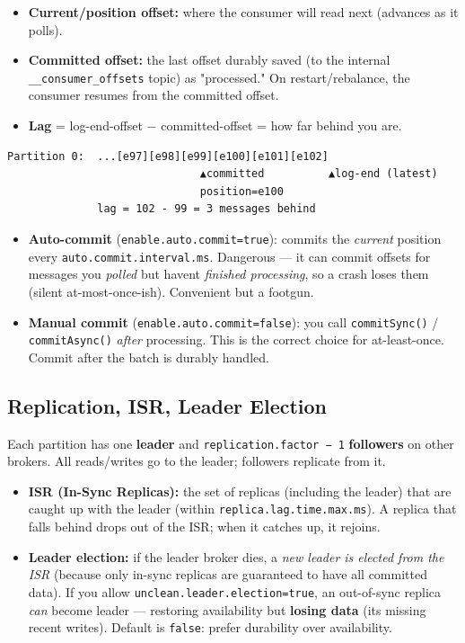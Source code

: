 \documentclass[11pt]{article}
\providecommand{\tightlist}{\setlength{\itemsep}{1pt}\setlength{\parskip}{0pt}}
\begin{document}
\begin{itemize}
\tightlist
\item
  \textbf{Current/position offset:} where the consumer will read next (advances as it polls).
\item
  \textbf{Committed offset:} the last offset durably saved (to the internal \texttt{\_\_consumer\_offsets} topic) as "processed." On restart/rebalance, the consumer resumes from the committed offset.
\item
  \textbf{Lag} = log-end-offset \(-\) committed-offset = how far behind you are.
\end{itemize}

\setcodelang{}

\begin{verbatim}
Partition 0:  ...[e97][e98][e99][e100][e101][e102]
                              ▲committed          ▲log-end (latest)
                              position=e100
              lag = 102 - 99 = 3 messages behind
\end{verbatim}

\begin{itemize}
\tightlist
\item
  \textbf{Auto-commit} (\texttt{enable.auto.commit=true}): commits the \emph{current} position every \texttt{auto.commit.interval.ms}. Dangerous --- it can commit offsets for messages you \emph{polled} but haven\textquotesingle t \emph{finished processing}, so a crash loses them (silent at-most-once-ish). Convenient but a footgun.
\item
  \textbf{Manual commit} (\texttt{enable.auto.commit=false}): you call \texttt{commitSync()} / \texttt{commitAsync()} \emph{after} processing. This is the correct choice for at-least-once. Commit after the batch is durably handled.
\end{itemize}

\subsection{Replication, ISR, Leader Election}\label{replication-isr-leader-election}

Each partition has one \textbf{leader} and \texttt{replication.factor\ −\ 1} \textbf{followers} on other brokers. All reads/writes go to the leader; followers replicate from it.

\begin{itemize}
\tightlist
\item
  \textbf{ISR (In-Sync Replicas):} the set of replicas (including the leader) that are caught up with the leader (within \texttt{replica.lag.time.max.ms}). A replica that falls behind drops out of the ISR; when it catches up, it rejoins.
\item
  \textbf{Leader election:} if the leader broker dies, a \emph{new leader is elected from the ISR} (because only in-sync replicas are guaranteed to have all committed data). If you allow \texttt{unclean.leader.election=true}, an out-of-sync replica \emph{can} become leader --- restoring availability but \textbf{losing data} (it\textquotesingle s missing recent writes). Default is \texttt{false}: prefer durability over availability.
\end{itemize}
\end{document}
